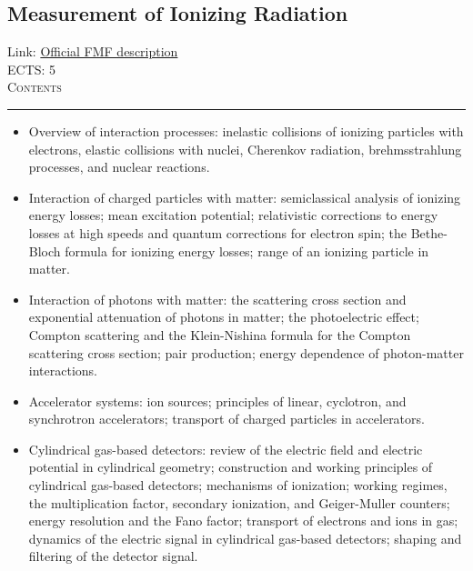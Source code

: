 \documentclass[11pt, a4paper]{article}
\newenvironment{course}[3]{
\subsection{#1}%
Link: \href{#2}{Official FMF description}\\%
ECTS: #3%
\vspace{1ex}
\\
{\large \textsc{Contents}}\\[-0.9ex]%
\rule{\textwidth}{0.5pt}
\vspace{-3ex}
}
{}
\newenvironment{chapter}[1]{
\begin{tcolorbox}[title=#1, breakable]
}
{\end{tcolorbox}}
\begin{document}
\begin{course}{Measurement of Ionizing Radiation}{https://www.fmf.uni-lj.si/en/study-physics/programmes/1fiz/2020/7000777/courses/1446/}{5}
    \label{measurement_of_ionizing_radiation}

    \begin{chapter}{Interaction of radiation with matter}
        \begin{itemize}
        
            \item Overview of interaction processes: inelastic collisions of ionizing particles with electrons, elastic collisions with nuclei, Cherenkov radiation, brehmsstrahlung processes, and nuclear reactions.

            \item Interaction of charged particles with matter: semiclassical analysis of ionizing energy losses; mean excitation potential; relativistic corrections to energy losses at high speeds and quantum corrections for electron spin; the Bethe-Bloch formula for ionizing energy losses; range of an ionizing particle in matter.

            \item Interaction of photons with matter: the scattering cross section and exponential attenuation of photons in matter; the photoelectric effect; Compton scattering and the Klein-Nishina formula for the Compton scattering cross section; pair production; energy dependence of photon-matter interactions.
        
        \end{itemize}
    \end{chapter}

    \begin{chapter}{Particle detectors}
        \begin{itemize}
            
            \item Accelerator systems: ion sources; principles of linear, cyclotron, and synchrotron accelerators; transport of charged particles in accelerators.

            \item Cylindrical gas-based detectors: review of the electric field and electric potential in cylindrical geometry; construction and working principles of cylindrical gas-based detectors; mechanisms of ionization; working regimes, the multiplication factor, secondary ionization, and Geiger-Muller counters; energy resolution and the Fano factor; transport of electrons and ions in gas; dynamics of the electric signal in cylindrical gas-based detectors; shaping and filtering of the detector signal.


\end{itemize}
\end{chapter}
\end{course}
\end{document}
